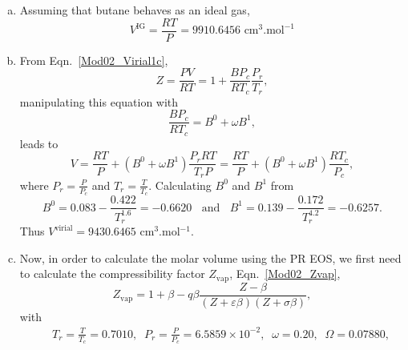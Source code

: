 \documentclass[12pts,a4paper,amsmath,amssymb,floatfix]{article}%
\newcommand{\frc}{\displaystyle\frac}
\begin{document}
\begin{enumerate}[1)]
           \begin{enumerate}[a)]
%
               \item Assuming that butane behaves as an ideal gas,
                    \begin{displaymath}
                        V^{\text{IG}} = \frc{RT}{P} = 9910.6456 \text{ cm}^{3}.\text{mol}^{-1}
                    \end{displaymath}
%
               \item From Eqn.~\ref{Mod02_Virial1c},
                  \begin{displaymath}
                     Z = \frc{P V}{R T} = 1 + \frc{B P_{c}}{R T_{c}}\frc{P_{r}}{T_{r}},
                  \end{displaymath}
                  manipulating this equation with 
                  \begin{displaymath}
                     \frc{B P_{c}}{R T_{c}} = B^{0} + \omega B^{1},
                  \end{displaymath}
                  leads to
                  \begin{displaymath}
                     V = \frc{R T}{P} + \left(B^{0} + \omega B^{1}\right) \frc{P_{r}R T}{T_{r}P} = \frc{R T}{P} + \left(B^{0} + \omega B^{1}\right)\frc{RT_{c}}{P_{c}},
                  \end{displaymath}
                  where $P_{r}=\frac{P}{P_{c}}$ and $T_{r}=\frac{T}{T_{c}}$. Calculating $B^{0}$ and $B^{1}$ from
                  \begin{displaymath}
                     B^{0} = 0.083 - \frc{0.422}{T_{r}^{1.6}} = -0.6620\;\;\text{ and }\;\; B^{1} = 0.139 - \frc{0.172}{T_{r}^{4.2}}=-0.6257.
                  \end{displaymath}
                  Thus $V^{\text{virial}} = 9430.6465$ cm$^{3}$.mol$^{-1}$.
%
               \item Now, in order to calculate the molar volume using the PR EOS, we first need to calculate the compressibility factor $Z_{\text{vap}}$, Eqn.~\ref{Mod02_Zvap},
                  \begin{displaymath}
                     Z_{\text{vap}} = 1 + \beta - q\beta \frc{Z - \beta} {\left(Z+\varepsilon\beta\right)\left(Z+\sigma\beta\right)},
                  \end{displaymath}
                  with
                  \begin{eqnarray}
                     && T_{r}=\frc{T}{T_{c}} = 0.7010,\;\;P_{r}=\frc{P}{P_{c}}=6.5859\times 10^{-2},\;\;\omega=0.20,\;\;\Omega = 0.07880, \nonumber \\

\end{eqnarray}
\end{enumerate}
\end{enumerate}
\end{document}
